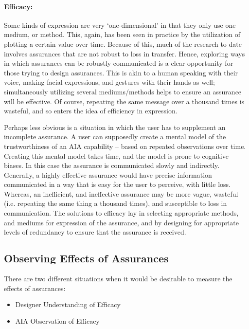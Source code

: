     \paragraph{Efficacy:} Some kinds of expression are very `one-dimensional' in that they only use one medium, or method. This, again, has been seen in practice by the utilization of plotting a certain value over time. Because of this, much of the research to date involves assurances that are not robust to loss in transfer. Hence, exploring ways in which assurances can be robustly communicated is a clear opportunity for those trying to design assurances. This is akin to a human speaking with their voice, making facial expressions, and gestures with their hands as well; simultaneously utilizing several mediums/methods helps to ensure an assurance will be effective. Of course, repeating the same message over a thousand times is wasteful, and so enters the idea of efficiency in expression.

    Perhaps less obvious is a situation in which the user has to supplement an incomplete assurance. A user can supposedly create a mental model of the trustworthiness of an AIA capability -- based on repeated observations over time. Creating this mental model takes time, and the model is prone to cognitive biases. In this case the assurance is communicated slowly and indirectly. Generally, a highly effective assurance would have precise information communicated in a way that is easy for the user to perceive, with little loss. Whereas, an inefficient, and ineffective assurance may be more vague, wasteful (i.e. repeating the same thing a thousand times), and susceptible to loss in communication. The solutions to efficacy lay in selecting appropriate methods, and mediums for expression of the assurance, and by designing for appropriate levels of redundancy to ensure that the assurance is received.

\subsection{Observing Effects of Assurances} \label{sec:measuring_effects}

    There are two different situations when it would be desirable to measure the effects of assurances:
    
    \begin{itemize}
        \item Designer Understanding of Efficacy
        \item AIA Observation of Efficacy
    \end{itemize}
    
